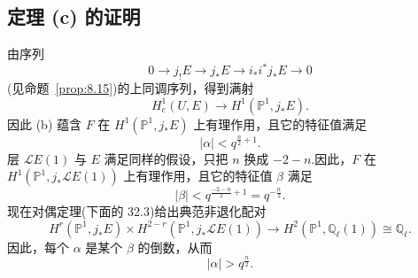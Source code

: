 \subsection*{定理 (c) 的证明}

由序列
\[
0 \to j_{!}E \to j_{*}E \to i_{*}i^{*}j_{*}E \to 0
\]
(见命题~\ref{prop:8.15})的上同调序列，得到满射
\[
H^{1}_{c}(U, E) \to H^{1}(\mathbb{P}^{1}, j_{*}E).
\]
因此 (b) 蕴含 $F$ 在 $H^{1}(\mathbb{P}^{1}, j_{*}E)$ 上有理作用，且它的特征值满足
\[
|\alpha| < q^{\frac{n}{2}+1}.
\]
层 $\mathcal{L}E(1)$ 与 $E$ 满足同样的假设，只把 $n$ 换成 $-2 - n$.因此，$F$ 在 $H^{1}(\mathbb{P}^{1}, j_{*}\mathcal{L}E(1))$ 上有理作用，且它的特征值 $\beta$ 满足
\[
|\beta| < q^{\frac{-2-n}{2}+1} = q^{-\frac{n}{2}}.
\]
现在对偶定理(下面的 32.3)给出典范非退化配对
\[
H^{r}(\mathbb{P}^{1}, j_{*}E) \times H^{2-r}(\mathbb{P}^{1}, j_{*}\mathcal{L}E(1)) \to H^{2}(\mathbb{P}^{1}, \mathbb{Q}_{\ell}(1)) \cong \mathbb{Q}_{\ell}.
\]
因此，每个 $\alpha$ 是某个 $\beta$ 的倒数，从而
\[
|\alpha| > q^{\frac{n}{2}}.
\]
